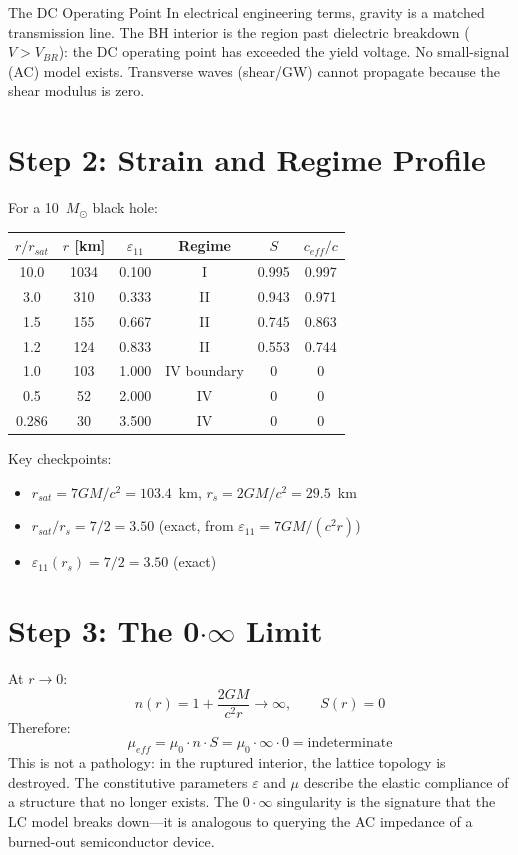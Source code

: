 \begin{resultbox}{The DC Operating Point}
In electrical engineering terms, gravity is a matched transmission line.
The BH interior is the region past dielectric breakdown ($V > V_{BR}$):
the DC operating point has exceeded the yield voltage.
No small-signal (AC) model exists. Transverse waves (shear/GW)
cannot propagate because the shear modulus is zero.
\end{resultbox}

\section{Step 2: Strain and Regime Profile}

For a 10~$M_\odot$ black hole:
\begin{center}
\begin{tabular}{cccccc}
\toprule
$r/r_{sat}$ & $r$ [km] & $\varepsilon_{11}$ & Regime & $S$ & $c_{eff}/c$ \\
\midrule
10.0  & 1034 & 0.100 & I  & 0.995 & 0.997 \\
3.0   & 310  & 0.333 & II & 0.943 & 0.971 \\
1.5   & 155  & 0.667 & II & 0.745 & 0.863 \\
1.2   & 124  & 0.833 & II & 0.553 & 0.744 \\
1.0   & 103  & 1.000 & IV boundary & 0 & 0 \\
0.5   & 52   & 2.000 & IV & 0 & 0 \\
0.286 & 30   & 3.500 & IV & 0 & 0 \\
\bottomrule
\end{tabular}
\end{center}

\noindent Key checkpoints:
\begin{itemize}
    \item $r_{sat} = 7GM/c^2 = 103.4$~km, $r_s = 2GM/c^2 = 29.5$~km
    \item $r_{sat}/r_s = 7/2 = 3.50$ (exact, from $\varepsilon_{11} = 7GM/(c^2 r)$)
    \item $\varepsilon_{11}(r_s) = 7/2 = 3.50$ (exact)
\end{itemize}

\section{Step 3: The 0$\cdot\infty$ Limit}

At $r \to 0$:
\begin{equation}
    n(r) = 1 + \frac{2GM}{c^2 r} \to \infty, \qquad S(r) = 0
\end{equation}
Therefore:
\begin{equation}
    \mu_{eff} = \mu_0 \cdot n \cdot S = \mu_0 \cdot \infty \cdot 0
    = \text{indeterminate}
\end{equation}
This is not a pathology: in the ruptured interior, the lattice topology is destroyed.
The constitutive parameters $\varepsilon$ and $\mu$ describe the elastic compliance
of a structure that no longer exists. The $0 \cdot \infty$ singularity
is the signature that the LC model breaks down---it is analogous
to querying the AC impedance of a burned-out semiconductor device.

